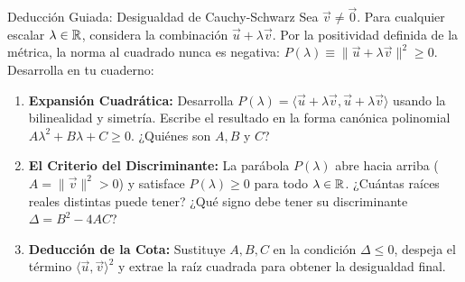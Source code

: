 \documentclass[10pt,aspectratio=169]{beamer}
\begin{document}
\begin{frame}{Deducción Guiada: Desigualdad de Cauchy-Schwarz}
  \vspace{0.05cm}
  Sea $\vec{v} \neq \vec{0}$. Para cualquier escalar $\lambda \in \mathbb{R}$, considera la combinación $\vec{u} + \lambda\vec{v}$. Por la positividad definida de la métrica, la norma al cuadrado nunca es negativa: $P(\lambda) \equiv \|\vec{u} + \lambda\vec{v}\|^2 \ge 0$. Desarrolla en tu cuaderno:
  \vspace{0.22cm}
  \begin{enumerate}\itemsep10pt
    \item[(a)] \textbf{Expansión Cuadrática:} Desarrolla $P(\lambda) = \langle \vec{u} + \lambda\vec{v}, \vec{u} + \lambda\vec{v}\rangle$ usando la bilinealidad y simetría. Escribe el resultado en la forma canónica polinomial $A\lambda^2 + B\lambda + C \ge 0$. ¿Quiénes son $A, B$ y $C$?
    \item[(b)] \textbf{El Criterio del Discriminante:} La parábola $P(\lambda)$ abre hacia arriba ($A = \|\vec{v}\|^2 > 0$) y satisface $P(\lambda) \ge 0$ para todo $\lambda \in \mathbb{R}$. ¿Cuántas raíces reales distintas puede tener? ¿Qué signo debe tener su discriminante $\Delta = B^2 - 4AC$?
    \item[(c)] \textbf{Deducción de la Cota:} Sustituye $A, B, C$ en la condición $\Delta \le 0$, despeja el término $\langle \vec{u}, \vec{v}\rangle^2$ y extrae la raíz cuadrada para obtener la desigualdad final.
  \end{enumerate}
\end{frame}
\end{document}
